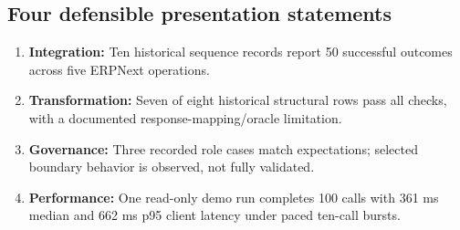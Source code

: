 \subsection*{Four defensible presentation statements}
\begin{enumerate}
\item \textbf{Integration:} Ten historical sequence records report 50 successful outcomes across five ERPNext operations.
\item \textbf{Transformation:} Seven of eight historical structural rows pass all checks, with a documented response-mapping/oracle limitation.
\item \textbf{Governance:} Three recorded role cases match expectations; selected boundary behavior is observed, not fully validated.
\item \textbf{Performance:} One read-only demo run completes 100 calls with 361 ms median and 662 ms p95 client latency under paced ten-call bursts.
\end{enumerate}

